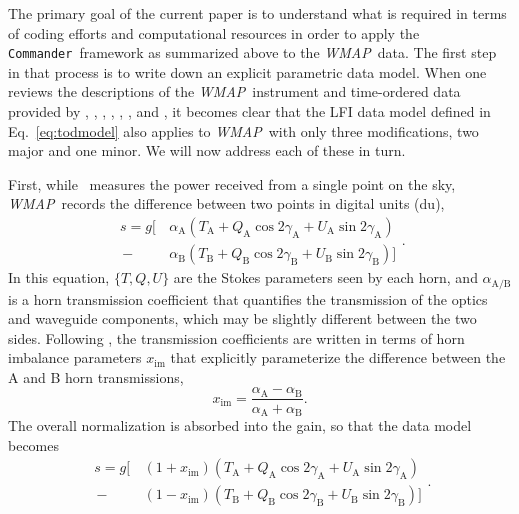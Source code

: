 \documentclass[twocolumn]{aa}
\def\WMAP{\emph{WMAP}}
\def\commander{\texttt{Commander}}
\newcommand{\A}[0]{\mathrm{A}}
\newcommand{\B}[0]{\mathrm{B}}
\begin{document}
The primary goal of the current paper is to understand what is required in
terms of coding efforts and computational resources in order to apply the \commander\
framework as summarized above to the \WMAP\ data. The first step in that
process is to write down an explicit parametric data model. When one reviews
the descriptions of the \WMAP\ instrument and time-ordered data provided by
\citet{bennett2003a}, \citet{barnes2003}, \citet{jarosik2003},
\citet{hinshaw2003a}, \citet{page2007}, \citet{jarosik2007}, and
\citet{wmapexsupp}, it becomes clear that the LFI data model defined in
Eq.~\eqref{eq:todmodel} also applies to \WMAP\ with only three modifications, 
two major and one minor. We will now address each of these in turn.

First, while \Planck\ measures the power received from a single point on the sky, \WMAP\
records the difference between two points in digital units
(du),
\begin{equation}
	\begin{split}
	s=%
		g\big[\,&\alpha_\A(T_\A + Q_\A\cos2\gamma_\A+U_\A\sin2\gamma_\A)
		\\
		\,-&\alpha_\B(T_\B + Q_\B\cos2\gamma_\B+U_\B\sin2\gamma_\B)\big]
	\end{split}.
        \label{eq:wmap_signal0}
\end{equation}
In this equation, $\{T,Q,U\}$ are the Stokes parameters seen by each horn, and
$\alpha_{\A/\B}$ is a horn transmission coefficient that quantifies the
transmission of the optics and waveguide components, which may be slightly different
between the two sides.  Following \citet{hinshaw2003a}, the transmission
coefficients are written in terms of horn imbalance parameters
$x_\mathrm{im}$ that explicitly parameterize the difference between the A and B
horn transmissions,
\begin{equation}
	x_{\mathrm{im}}=\frac{\alpha_{\A}-\alpha_{\B}}{\alpha_{\A}+\alpha_{\B}}.
\end{equation} 
The overall normalization is absorbed into the gain, so that the data model becomes
\begin{equation}
	\begin{split}
	s=%
		g\big[\,&(1+x_{\mathrm{im}})(T_\A + Q_\A\cos2\gamma_\A+U_\A\sin2\gamma_\A)
		\\
		\,-&(1-x_\mathrm{im})(T_\B + Q_\B\cos2\gamma_\B+U_\B\sin2\gamma_\B)\big]
	\end{split}.
        \label{eq:wmap_signal}
\end{equation}
\end{document}
